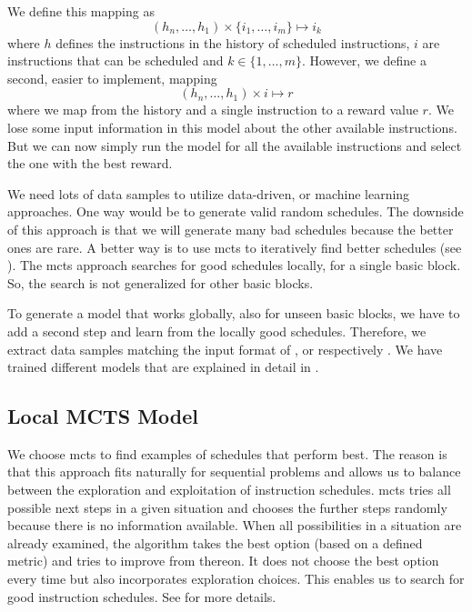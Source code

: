 We define this mapping as
\begin{equation}
    (h_n, \ldots, h_1) \times \{i_1, \ldots, i_m\} \mapsto i_k
    \label{eqn:mlmapping1}
\end{equation}
where $h$ defines the instructions in the history of scheduled instructions, $i$ are instructions that can be scheduled and $k \in \{1, \ldots, m\}$.
However, we define a second, easier to implement, mapping
\begin{equation}
    (h_n, \ldots, h_1) \times i \mapsto r
    \label{eqn:mlmapping2}
\end{equation}
where we map from the history and a single instruction to a reward value $r$.
We lose some input information in this model about the other available instructions.
But we can now simply run the model for all the available instructions and select the one with the best reward.

We need lots of data samples to utilize data-driven, or machine learning approaches.
One way would be to generate valid random schedules.
The downside of this approach is that we will generate many bad schedules because the better ones are rare.
A better way is to use \ac{mcts} to iteratively find better schedules (see ).
The \ac{mcts} approach searches for good schedules locally, \ie for a single basic block.
So, the search is not generalized for other basic blocks.

To generate a model that works globally, \ie also for unseen basic blocks, we have to add a second step and learn from the locally good schedules.
Therefore, we extract data samples matching the input format of , or respectively .
We have trained different models that are explained in detail in .

\subsection{Local MCTS Model}
\label{subsec:approach:ml:mcts}
We choose \ac{mcts} to find examples of schedules that perform best.
The reason is that this approach fits naturally for sequential problems and allows us to balance between the exploration and exploitation of instruction schedules. 
\ac{mcts} tries all possible next steps in a given situation and chooses the further steps randomly because there is no information available.
When all possibilities in a situation are already examined, the algorithm takes the best option (based on a defined metric) and tries to improve from thereon.
It does not choose the best option every time but also incorporates exploration choices.
This enables us to search for good instruction schedules.
See  for more details.

